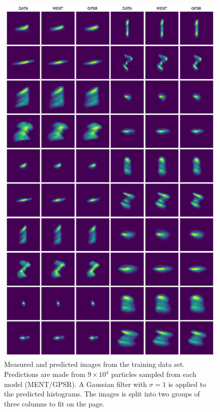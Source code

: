 \documentclass[%
    reprint,
    onecolumn,
    nofootinbib,
    amsmath,
    amssymb,
    aps,
    prstab,
]{revtex4-2}
\begin{document}
%
\begin{figure}
    \centering
    \includegraphics[width=0.66\linewidth]{fig_compare_data_train.pdf}
    \caption{Measured and predicted images from the training data set. Predictions are made from $9 \times 10^4$ particles sampled from each model (MENT/GPSR). A Gaussian filter with $\sigma = 1$ is applied to the predicted histograms. The images is split into two groups of three columns to fit on the page.}
    \label{fig:data-train}
\end{figure}
%
\end{document}
